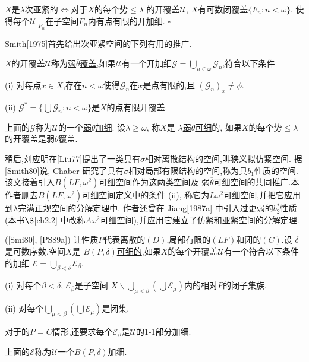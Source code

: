 \documentclass[main.tex]{subfiles}
\begin{document}
\begin{corollary}
$X$是$\lambda$次亚紧的$\Leftrightarrow$对于$X$的每个势$\le\lambda$
的开覆盖$\mathscr{U}$, $X$有可数闭覆盖$\{F_n:n<\omega\}$,
使得每个$\mathscr{U}|_{F_n}$在子空间$F_n$内有点有限的开加细. $\square$
\end{corollary}

Smith[1975]首先给出次亚紧空间的下列有用的推广.

\begin{definition}
$X$的开覆盖$\mathscr{U}$称为\underline{弱$\overline{\theta}$覆盖},如果$\mathscr{U}$有一个开加细$\mathscr{G}=\bigcup_{n\in\omega}\mathscr{G}_n$,符合以下条件

\textnormal{(i)} 对每点$x\in X$,存在$n<\omega$使得$\mathscr{G}_n$在$x$是点有限的,且
$(\mathscr{G}_n)_x \ne \phi$.

\textnormal{(ii)} $\mathscr{G}^* =\{\bigcup \mathscr{G}_n: n<\omega\}$是$X$的点有限开覆盖.

上面的$\mathscr{G}$称为$\mathscr{U}$的一个\underline{弱$\overline{\theta}$加细}.
设$\lambda\ge\omega$, 称$X$是 \underline{$\lambda$弱$\overline{\theta}$可细}的,
如果$X$的每个势$\le\lambda$的开覆盖是弱$\overline{\theta}$覆盖.
\end{definition}

稍后,刘应明在[Liu77]提出了一类具有$\sigma$相对离散结构的空间,叫狭义拟仿紧空间.
据[Smith80]说, Chaber 研究了具有$\sigma$相对局部有限结构的空间,称为具$b_1$性质的空间.
该文接着引入$B(LF,\omega^2)$可细空间作为这两类空间及
弱$\overline{\theta}$可细空间的共同推广.本作者删去$B(LF,\omega^2)$可细空间定义中的条件
 (ii), 称它为$L\omega^2$可细空间,并把它应用到$\lambda$完满正规空间的分解定理中.
 作者还曾在 Jiang[1987a] 中引入过更弱的$b_2^*$性质(本书$\S$\ref{ch2.2} 中改称$A\omega^2$可细空间),并应用它建立了仿紧和亚紧空间的分解定理.

\begin{definition}\label{def1.2.3}
\textnormal{([Smi80], [PS89a])}	让性质$P$代表离散的$(D)$,局部有限的$(LF)$和闭的$(C)$.设
$\delta$是可数序数.空间$X$是
\underline{$B(P,\delta)$可细的},如果$X$的每个开覆盖$\mathscr{U}$有一个符合以下条件的加细
$\mathscr{E}=\bigcup_{\beta<\delta}\mathscr{E}_\beta$.

\textnormal{(i)} 对每个$\beta<\delta$, $\mathscr{E}_\beta$是子空间
$X\backslash\bigcup_{\mu<\beta}(\bigcup\mathscr{E}_\mu)$内的相对$P$的闭子集族.

\textnormal{(ii)} 对每个$\bigcup_{\mu<\beta}(\bigcup\mathscr{E}_\mu)$是闭集.

对于的$P=C$情形,还要求每个$\mathscr{E}_\beta$是$\mathscr{U}$的\textnormal{1-1}部分加细.

上面的$\mathscr{E}$称为$\mathscr{U}$一个$B(P,\delta)$加细.
\end{definition}
	
\end{document}
